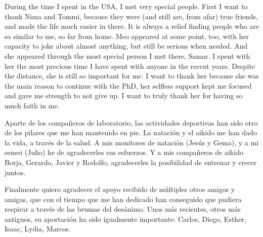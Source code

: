 During the time I spent in the USA, I met very special people. First I want to
thank Nima and Tommi, because they were (and still are, from afar) true friends,
and made the life much easier in there. It is always a relief finding people who
are so similar to me, so far from home. Meo appeared at some point, too, with
her capacity to joke about almost anything, but still be serious when needed.
And she appeared through the most special person I met there, Samar. I spent
with her the most precious time I have spent with anyone in the recent years.
Despite the distance, she is still so important for me. I want to thank her
because she was the main reason to continue with the PhD, her selfless support
kept me focused and gave me strength to not give up. I want to truly thank her
for having so much faith in me.

Aparte de los compañeros de laboratorio, las actividades deportivas han sido
otro de los pilares que me han mantenido en pie. La natación y el aikido me han
dado la vida, a través de la salud. A mis monitores de natación (Jesús y Gema),
y a mi sensei (Julio) he de agradecerles sus esfuerzos. Y a mis compañeros de
aikido Borja, Gerardo, Javier y Rodolfo, agradecerles la posibilidad de entrenar
y crecer juntos.

Finalmente quiero agradecer el apoyo recibido de múltiples otros amigos y
amigas, que con el tiempo que me han dedicado han conseguido que pudiera
respirar a través de las brumas del desánimo. Unos más recientes, otros más
antiguos, su aportación ha sido igualmente importante: Carlos, Diego, Esther,
Isaac, Lydia, Marcos.
